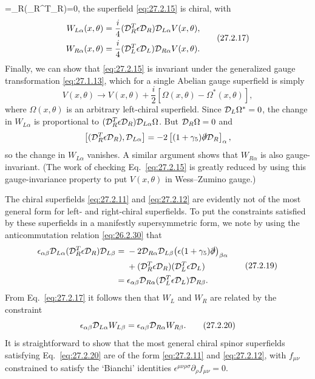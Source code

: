=\SuperD_R(\SuperD_R^T\epsilon\SuperD_R)=0\), the superfield
\eqref{eq:27.2.15} is chiral, with
\begin{equation}
  \begin{aligned}
  W_{L\alpha}(x,\theta)
  &=\frac{i}{4}(\mathcal{D}_R^T\epsilon\mathcal{D}_R)
    \mathcal{D}_{L\alpha}V(x,\theta),
  \\
  W_{R\alpha}(x,\theta)
  &=\frac{i}{4}(\mathcal{D}_L^T\epsilon\mathcal{D}_L)
    \mathcal{D}_{R\alpha}V(x,\theta).
  \end{aligned}
  \tag{27.2.17}\label{eq:27.2.17}
\end{equation}
Finally, we can show that \eqref{eq:27.2.15} is invariant under the
generalized gauge transformation \eqref{eq:27.1.13}, which for a single
Abelian gauge superfield is simply
\begin{equation}
  V(x,\theta)\longrightarrow
  V(x,\theta)+\frac{i}{2}
  \left[\Omega(x,\theta)-\Omega^*(x,\theta)\right],
  \tag{27.2.18}\label{eq:27.2.18}
\end{equation}
where \(\Omega(x,\theta)\) is an arbitrary left-chiral superfield. Since
\(\mathcal{D}_L\Omega^*=0\), the change in \(W_{L\alpha}\) is proportional to
\((\mathcal{D}_R^T\epsilon\mathcal{D}_R)\mathcal{D}_{L\alpha}\Omega\). But
\(\mathcal{D}_R\Omega=0\) and
\[
  \left[(\mathcal{D}_R^T\epsilon\mathcal{D}_R),\mathcal{D}_{L\alpha}\right]
  =-2\left[(1+\gamma_5)\slashed{\partial}\mathcal{D}_R\right]_\alpha,
\]
so the change in \(W_{L\alpha}\) vanishes. A similar argument shows that
\(W_{R\alpha}\) is also gauge-invariant. (The work of checking
Eq.~\eqref{eq:27.2.15} is greatly reduced by using this gauge-invariance
property to put \(V(x,\theta)\) in Wess--Zumino gauge.)

The chiral superfields \eqref{eq:27.2.11} and \eqref{eq:27.2.12} are
evidently not of the most general form for left- and right-chiral
superfields. To put the constraints satisfied by these superfields in a
manifestly supersymmetric form, we note by using the anticommutation
relation \eqref{eq:26.2.30} that
\begin{equation}
  \begin{aligned}
  \epsilon_{\alpha\beta}\mathcal{D}_{L\alpha}
    (\mathcal{D}_R^T\epsilon\mathcal{D}_R)\mathcal{D}_{L\beta}
  ={}&-2\mathcal{D}_{R\alpha}\mathcal{D}_{L\beta}
    \bigl(\epsilon(1+\gamma_5)\slashed{\partial}\bigr)_{\beta\alpha}
  \\
  &+(\mathcal{D}_R^T\epsilon\mathcal{D}_R)
    (\mathcal{D}_L^T\epsilon\mathcal{D}_L)
  \\
  ={}&\epsilon_{\alpha\beta}\mathcal{D}_{R\alpha}
    (\mathcal{D}_L^T\epsilon\mathcal{D}_L)\mathcal{D}_{R\beta}.
  \end{aligned}
  \tag{27.2.19}\label{eq:27.2.19}
\end{equation}
From Eq.~\eqref{eq:27.2.17} it follows then that \(W_L\) and \(W_R\) are
related by the constraint
\begin{equation}
  \epsilon_{\alpha\beta}\mathcal{D}_{L\alpha}W_{L\beta}
  =\epsilon_{\alpha\beta}\mathcal{D}_{R\alpha}W_{R\beta}.
  \tag{27.2.20}\label{eq:27.2.20}
\end{equation}
It is straightforward to show that the most general chiral spinor
superfields satisfying Eq.~\eqref{eq:27.2.20} are of the form
\eqref{eq:27.2.11} and \eqref{eq:27.2.12}, with \(f_{\mu\nu}\) constrained
to satisfy the `Bianchi' identities
\(\epsilon^{\mu\nu\rho\sigma}\partial_\rho f_{\mu\nu}=0\).

